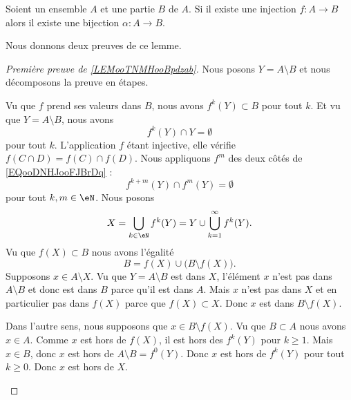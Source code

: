 \begin{lemma}     \label{LEMooTNMHooBpdzab}
	Soient un ensemble \( A\) et une partie \( B\) de \( A\). Si il existe une injection \( f\colon A\to B\) alors il existe une bijection \( \alpha\colon A\to B\).
\end{lemma}

Nous donnons deux preuves de ce lemme.

\begin{proof}[Première preuve de \ref{LEMooTNMHooBpdzab}]
	Nous posons \( Y=A\setminus B\) et nous décomposons la preuve en étapes.
	\begin{subproof}
		Vu que \( f\) prend ses valeurs dans \( B\), nous avons \( f^k(Y)\subset B\) pour tout \( k\). Et vu que \( Y=A\setminus B\), nous avons
		\begin{equation}        \label{EQooDNHJooFJBrDq}
			f^k(Y)\cap Y=\emptyset
		\end{equation}
		pour tout \( k\). L'application \( f\) étant injective, elle vérifie \( f(C\cap D)=f(C)\cap f(D)\). Nous appliquons \( f^m\) des deux côtés de \eqref{EQooDNHJooFJBrDq} :
		\begin{equation}
			f^{k+m}(Y)\cap f^m(Y)=\emptyset
		\end{equation}
		pour tout \( k,m\in \eN\).
		Nous posons
		\begin{equation}
			X=\bigcup_{k\in \eN}f^k(Y)=Y\cup\bigcup_{k=1}^{\infty}f^k(Y).
		\end{equation}
		Vu que \( f(X)\subset B\) nous avons l'égalité
		\begin{equation}
			B=f(X)\cup\big(B\setminus f(X)\big).
		\end{equation}
		\spitem[\( A\setminus X=B\setminus f(X)\)]
		Supposons \( x\in A\setminus X\). Vu que \( Y=A\setminus B\) est dans \( X\), l'élément \( x\) n'est pas dans \( A\setminus B\) et donc est dans \( B\) parce qu'il est dans \( A\). Mais \( x\) n'est pas dans \( X\) et en particulier pas dans \( f(X)\) parce que \( f(X)\subset X\). Donc \( x\) est dans \( B\setminus f(X)\).

		Dans l'autre sens, nous supposons que \( x\in B\setminus f(X)\). Vu que \( B\subset A\) nous avons \( x\in A\). Comme \( x\) est hors de \( f(X)\), il est hors des \( f^k(Y)\) pour \( k\geq 1\). Mais \( x\in B\), donc \( x\) est hors de \( A\setminus B=f^0(Y)\). Donc \( x\) est hors de \( f^k(Y)\) pour tout \( k\geq 0\). Donc \( x\) est hors de \( X\).


\end{subproof}
\end{proof}

